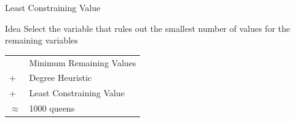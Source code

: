 \documentclass[14pt]{beamer}
\begin{document}
\begin{frame}{Least Constraining Value}
	\begin{block}{Idea}
		Select the variable that rules out the smallest
		number of values for the remaining variables
	\end{block}
	\pause
	\begin{center}
	\end{center}
	\pause
	\begin{tabular}{ll}
		          & Minimum Remaining Values \\
		+         & Degree Heuristic \\
		+         & Least Constraining Value \\
		\hline
		$\approx$ & 1000 queens
	\end{tabular}
\end{frame}
\end{document}
